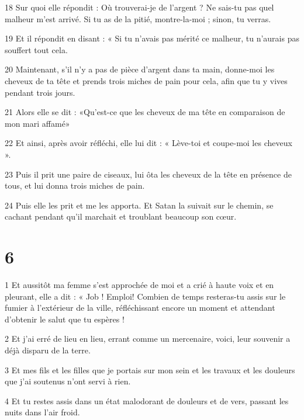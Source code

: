 \par 18 Sur quoi elle répondit : Où trouverai-je de l'argent ? Ne sais-tu pas quel malheur m'est arrivé. Si tu as de la pitié, montre-la-moi ; sinon, tu verras.

\par 19 Et il répondit en disant : « Si tu n'avais pas mérité ce malheur, tu n'aurais pas souffert tout cela.

\par 20 Maintenant, s'il n'y a pas de pièce d'argent dans ta main, donne-moi les cheveux de ta tête et prends trois miches de pain pour cela, afin que tu y vives pendant trois jours.

\par 21 Alors elle se dit : «Qu'est-ce que les cheveux de ma tête en comparaison de mon mari affamé»

\par 22 Et ainsi, après avoir réfléchi, elle lui dit : « Lève-toi et coupe-moi les cheveux ».

\par 23 Puis il prit une paire de ciseaux, lui ôta les cheveux de la tête en présence de tous, et lui donna trois miches de pain.

\par 24 Puis elle les prit et me les apporta. Et Satan la suivait sur le chemin, se cachant pendant qu'il marchait et troublant beaucoup son cœur.

\chapter{6}

\par 1 Et aussitôt ma femme s'est approchée de moi et a crié à haute voix et en pleurant, elle a dit : « Job ! Emploi! Combien de temps resteras-tu assis sur le fumier à l'extérieur de la ville, réfléchissant encore un moment et attendant d'obtenir le salut que tu espères !

\par 2 Et j'ai erré de lieu en lieu, errant comme un mercenaire, voici, leur souvenir a déjà disparu de la terre.

\par 3 Et mes fils et les filles que je portais sur mon sein et les travaux et les douleurs que j'ai soutenus n'ont servi à rien.

\par 4 Et tu restes assis dans un état malodorant de douleurs et de vers, passant les nuits dans l'air froid.

